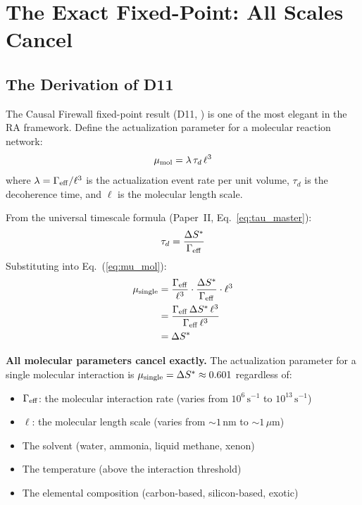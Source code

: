 \documentclass[12pt,a4paper]{article}
\begin{document}
\section{The Exact Fixed-Point: All Scales Cancel}\label{sec:fixed_point}

\subsection{The Derivation of D11}

The Causal Firewall fixed-point result (D11, \statusDR) is one of the most elegant in the RA framework.  Define the actualization parameter for a molecular reaction network:
\begin{equation}
  \mu_{\rm mol} = \lambda\,\tau_d\,\ell^3
  \label{eq:mu_mol}
\end{equation}
where $\lambda = \Gamma_{\rm eff}/\ell^3$ is the actualization event rate per unit volume, $\tau_d$ is the decoherence time, and $\ell$ is the molecular length scale.

From the universal timescale formula (Paper~II, Eq.~\ref{eq:tau_master}):
\begin{equation}
  \tau_d = \frac{\Delta S^*}{\Gamma_{\rm eff}}
  \label{eq:tau_sub}
\end{equation}
Substituting into Eq.~(\ref{eq:mu_mol}):
\begin{align}
  \mu_{\rm single} &= \frac{\Gamma_{\rm eff}}{\ell^3}\cdot\frac{\Delta S^*}{\Gamma_{\rm eff}}\cdot\ell^3 \\
  &= \frac{\Gamma_{\rm eff}\,\Delta S^*\,\ell^3}{\Gamma_{\rm eff}\,\ell^3} \\
  &= \Delta S^*
  \label{eq:cancellation}
\end{align}

\textbf{All molecular parameters cancel exactly.}  The actualization parameter for a single molecular interaction is $\mu_{\rm single}=\Delta S^*\approx0.601$ regardless of:
\begin{itemize}
  \item $\Gamma_{\rm eff}$: the molecular interaction rate (varies from $10^6\,\mathrm{s}^{-1}$ to $10^{13}\,\mathrm{s}^{-1}$)
  \item $\ell$: the molecular length scale (varies from $\sim1\,\mathrm{nm}$ to $\sim1\,\mu\mathrm{m}$)
  \item The solvent (water, ammonia, liquid methane, xenon)
  \item The temperature (above the interaction threshold)
  \item The elemental composition (carbon-based, silicon-based, exotic)
\end{itemize}
\end{document}
